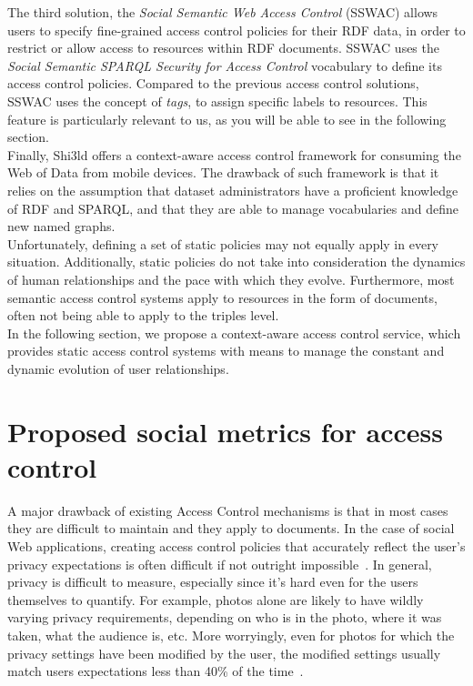 The third solution, the \textit{Social Semantic Web Access Control} (SSWAC) allows users to specify fine-grained access control policies for their RDF data, in order to restrict or allow access to resources within RDF documents. SSWAC uses the \textit{Social Semantic SPARQL Security for Access Control} vocabulary to define its access control policies. Compared to the previous access control solutions, SSWAC uses the concept of \textit{tags}, to assign specific labels to resources. This feature is particularly relevant to us, as you will be able to see in the following section.\\

Finally, Shi3ld offers a context-aware access control framework for consuming the Web of Data from mobile devices. The drawback of such framework is that it relies on the assumption that dataset administrators have a proficient knowledge of RDF and SPARQL, and that they are able to manage vocabularies and define new named graphs.\\

Unfortunately, defining a set of static policies may not equally apply in every situation. Additionally, static policies do not take into consideration the dynamics of human relationships and the pace with which they evolve. Furthermore, most semantic access control systems apply to resources in the form of documents, often not being able to apply to the triples level.\\

In the following section, we propose a context-aware access control service, which provides static access control systems with means to manage the constant and dynamic evolution of user relationships. 

\section{Proposed social metrics for access control}
\label{sec:dracl}
A major drawback of existing Access Control mechanisms is that in most cases they are difficult to maintain and they apply to documents. In the case of social Web applications, creating access control policies that accurately reflect the user's privacy expectations is often difficult if not outright impossible~\cite{madden2012privacy}. In general, privacy is difficult to measure, especially since it's hard even for the users themselves to quantify. For example, photos alone are likely to have wildly varying privacy requirements, depending on who is in the photo, where it was taken, what the audience is, etc. More worryingly, even for photos for which the privacy settings have been modified by the user, the modified settings usually match users expectations less than 40\% of the time~\cite{liu2011analyzing}.\\

